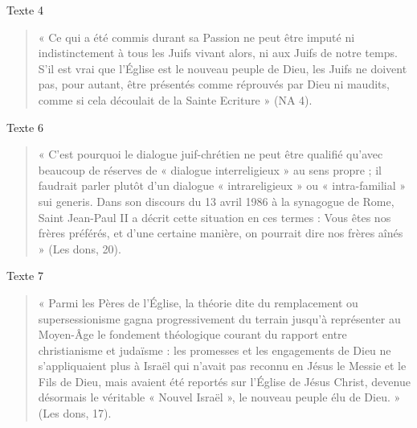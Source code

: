 Texte  4 
\begin{quote}
    «  Ce  qui  a  été  commis  durant  sa  Passion  ne  peut  être  imputé  ni  indistinctement  à  tous  les  Juifs vivant  alors,  ni  aux  Juifs  de  notre  temps.  S’il  est  vrai  que  l’Église  est  le  nouveau  peuple  de Dieu,  les  Juifs  ne  doivent  pas,  pour  autant,  être  présentés  comme  réprouvés  par  Dieu  ni maudits, comme  si  cela  découlait  de  la  Sainte  Ecriture  »  (NA  4). 

\end{quote}


Texte  6 \begin{quote}
    «  C’est  pourquoi  le  dialogue  juif-chrétien  ne  peut  être  qualifié  qu’avec  beaucoup  de  réserves de  «  dialogue  interreligieux  »  au  sens  propre  ;  il  faudrait  parler  plutôt  d’un  dialogue  «  intrareligieux  »  ou  «  intra-familial  »  sui  generis.  Dans  son  discours  du  13  avril  1986  à  la synagogue  de  Rome,  Saint  Jean-Paul  II  a  décrit  cette  situation  en  ces  termes  :  Vous  êtes  nos frères  préférés, et  d’une  certaine  manière, on pourrait  dire  nos  frères  aînés  »  (Les  dons, 20). 
\end{quote} 

Texte  7 
\begin{quote}
    «  Parmi  les  Pères  de  l’Église,  la  théorie  dite  du  remplacement  ou  supersessionisme  gagna progressivement  du  terrain  jusqu’à  représenter  au  Moyen-Âge  le  fondement  théologique courant  du  rapport  entre  christianisme  et  judaïsme  :  les  promesses  et  les  engagements  de  Dieu ne  s’appliquaient  plus  à  Israël  qui  n’avait  pas  reconnu  en  Jésus  le  Messie  et  le  Fils  de  Dieu, mais  avaient  été  reportés  sur  l’Église  de  Jésus  Christ,  devenue  désormais  le  véritable  « Nouvel  Israël  », le  nouveau peuple  élu de  Dieu.  »  (Les  dons,  17).   
\end{quote}



